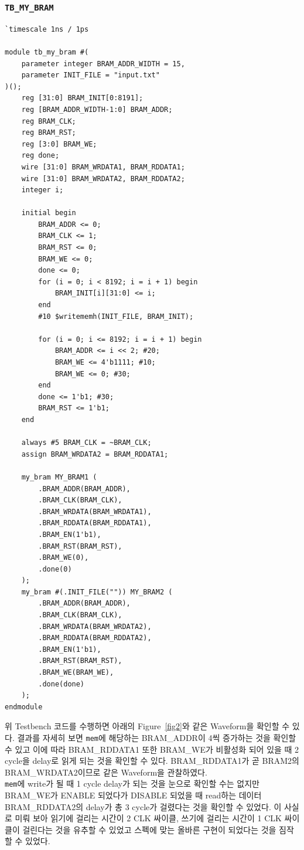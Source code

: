 \documentclass{article}
\begin{document}
\subsubsection*{\texttt{TB\_MY\_BRAM}}
\begin{lstlisting}[style={verilog-style}]
`timescale 1ns / 1ps

module tb_my_bram #(
    parameter integer BRAM_ADDR_WIDTH = 15,
    parameter INIT_FILE = "input.txt"
)();
    reg [31:0] BRAM_INIT[0:8191];
    reg [BRAM_ADDR_WIDTH-1:0] BRAM_ADDR;
    reg BRAM_CLK;
    reg BRAM_RST;
    reg [3:0] BRAM_WE;
    reg done;
    wire [31:0] BRAM_WRDATA1, BRAM_RDDATA1;
    wire [31:0] BRAM_WRDATA2, BRAM_RDDATA2;
    integer i;
    
    initial begin
        BRAM_ADDR <= 0;
        BRAM_CLK <= 1;
        BRAM_RST <= 0;
        BRAM_WE <= 0;
        done <= 0;
        for (i = 0; i < 8192; i = i + 1) begin
            BRAM_INIT[i][31:0] <= i;
        end
        #10 $writememh(INIT_FILE, BRAM_INIT);
        
        for (i = 0; i <= 8192; i = i + 1) begin
            BRAM_ADDR <= i << 2; #20;
            BRAM_WE <= 4'b1111; #10;
            BRAM_WE <= 0; #30;
        end
        done <= 1'b1; #30;
        BRAM_RST <= 1'b1;
    end
    
    always #5 BRAM_CLK = ~BRAM_CLK;
    assign BRAM_WRDATA2 = BRAM_RDDATA1;
    
    my_bram MY_BRAM1 (
        .BRAM_ADDR(BRAM_ADDR),
        .BRAM_CLK(BRAM_CLK),
        .BRAM_WRDATA(BRAM_WRDATA1),
        .BRAM_RDDATA(BRAM_RDDATA1),
        .BRAM_EN(1'b1),
        .BRAM_RST(BRAM_RST),
        .BRAM_WE(0),
        .done(0)
    );
    my_bram #(.INIT_FILE("")) MY_BRAM2 (
        .BRAM_ADDR(BRAM_ADDR),
        .BRAM_CLK(BRAM_CLK),
        .BRAM_WRDATA(BRAM_WRDATA2),
        .BRAM_RDDATA(BRAM_RDDATA2),
        .BRAM_EN(1'b1),
        .BRAM_RST(BRAM_RST),
        .BRAM_WE(BRAM_WE),
        .done(done)
    );
endmodule
\end{lstlisting}

위 Testbench 코드를 수행하면 아래의 Figure~\ref{fig2}와 같은 Waveform을 확인할 수 있다. 결과를 자세히 보면 \texttt{mem}에 해당하는 BRAM\_ADDR이 4씩 증가하는 것을 확인할 수 있고 이에 따라 BRAM\_RDDATA1 또한 BRAM\_WE가 비활성화 되어 있을 때 2 cycle을 delay로 읽게 되는 것을 확인할 수 있다. BRAM\_RDDATA1가 곧 BRAM2의 BRAM\_WRDATA2이므로 같은 Waveform을 관찰하였다. \\

\texttt{mem}에 write가 될 때 1 cycle delay가 되는 것을 눈으로 확인할 수는 없지만 BRAM\_WE가 ENABLE 되었다가 DISABLE 되었을 때 read하는 데이터 BRAM\_RDDATA2의 delay가 총 3 cycle가 걸렸다는 것을 확인할 수 있었다. 이 사실로 미뤄 보아 읽기에 걸리는 시간이 2 CLK 싸이클, 쓰기에 걸리는 시간이 1 CLK 싸이클이 걸린다는 것을 유추할 수 있었고 스펙에 맞는 올바른 구현이 되었다는 것을 짐작할 수 있었다.\\
\end{document}
